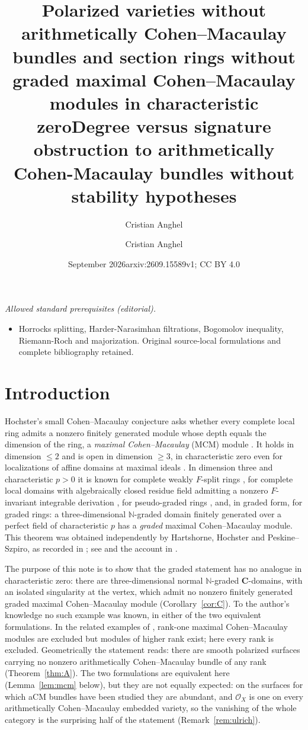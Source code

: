 \documentclass[11pt]{amsart}
\title[Varieties without aCM bundles, rings without graded MCM modules]{Polarized varieties without arithmetically Cohen--Macaulay bundles and section rings without graded maximal Cohen--Macaulay modules in characteristic zero}
\author{Cristian Anghel}
\date{September 2026}
\title{Degree versus signature obstruction to arithmetically Cohen-Macaulay bundles without stability hypotheses}
\author{Cristian Anghel}
\date{arxiv:2609.15589v1; CC BY 4.0}
\theoremstyle{remark}
\theoremstyle{definition}
\newcommand{\NN}{\mathbb{N}}
\newcommand{\CC}{\mathbf{C}}
\newcommand{\cO}{\mathcal{O}}
\begin{document}
\maketitle
\noindent\textit{Allowed standard prerequisites (editorial).}\begin{itemize}
\item Horrocks splitting, Harder-Narasimhan filtrations, Bogomolov inequality, Riemann-Roch and majorization. Original source-local formulations and complete bibliography retained.
\end{itemize}\medskip
\section*{Introduction}

Hochster's small Cohen--Macaulay conjecture asks whether every complete local ring admits a nonzero finitely generated module whose depth equals the dimension of the ring, a \emph{maximal Cohen--Macaulay} (MCM) module \cite{Ho75,Ho04}. It holds in dimension $\le2$ and is open in dimension $\ge3$, in characteristic zero even for localizations of affine domains at maximal ideals \cite{ShTa}. In dimension three and characteristic $p>0$ it is known for complete weakly $F$-split rings \cite{Sch17}, for complete local domains with algebraically closed residue field admitting a nonzero $F$-invariant integrable derivation \cite[Thm.~3.4]{Sch20}, for pseudo-graded rings \cite{Sch20}, and, in graded form, for graded rings: a three-dimensional $\NN$-graded domain finitely generated over a perfect field of characteristic $p$ has a \emph{graded} maximal Cohen--Macaulay module. This theorem was obtained independently by Hartshorne, Hochster and Peskine--Szpiro, as recorded in \cite[Thm.~1 and Cor.~2]{Ho04}; see \cite{Ho75,PS} and the account in \cite{ShTa}.

The purpose of this note is to show that the graded statement has no analogue in characteristic zero: there are three-dimensional normal $\NN$-graded $\CC$-domains, with an isolated singularity at the vertex, which admit no nonzero finitely generated graded maximal Cohen--Macaulay module (Corollary~\ref{cor:C}). To the author's knowledge no such example was known, in either of the two equivalent formulations. In the related examples of \cite[Thm.~3.4 and Rem.~3.6]{Ma19}, rank-one maximal Cohen--Macaulay modules are excluded but modules of higher rank exist; here every rank is excluded. Geometrically the statement reads: there are smooth polarized surfaces carrying no nonzero arithmetically Cohen--Macaulay bundle of any rank (Theorem~\ref{thm:A}). The two formulations are equivalent here (Lemma~\ref{lem:mcm} below), but they are not equally expected: on the surfaces for which aCM bundles have been studied they are abundant, and $\cO_X$ is one on every arithmetically Cohen--Macaulay embedded variety, so the vanishing of the whole category is the surprising half of the statement (Remark~\ref{rem:ulrich}).
\end{document}
